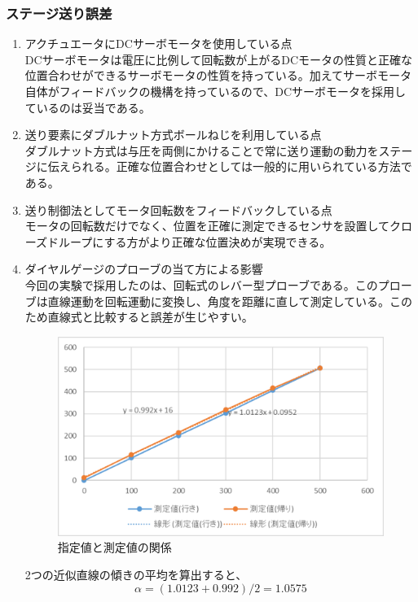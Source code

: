 \documentclass[a4j,twoside,openright,11pt]{jarticle}
\begin{document}
\subsubsection{ステージ送り誤差}
\begin{enumerate}
\item アクチュエータにDCサーボモータを使用している点\\
DCサーボモータは電圧に比例して回転数が上がるDCモータの性質と正確な位置合わせができるサーボモータの性質を持っている。加えてサーボモータ自体がフィードバックの機構を持っているので、DCサーボモータを採用しているのは妥当である。
\item 送り要素にダブルナット方式ボールねじを利用している点\\
ダブルナット方式は与圧を両側にかけることで常に送り運動の動力をステージに伝えられる。正確な位置合わせとしては一般的に用いられている方法である。
\item 送り制御法としてモータ回転数をフィードバックしている点\\
モータの回転数だけでなく、位置を正確に測定できるセンサを設置してクローズドループにする方がより正確な位置決めが実現できる。
\item ダイヤルゲージのプローブの当て方による影響\\
今回の実験で採用したのは、回転式のレバー型プローブである。このプローブは直線運動を回転運動に変換し、角度を距離に直して測定している。このため直線式と比較すると誤差が生じやすい。

\begin{figure}[htbp]
\begin{center}
\includegraphics[width=12cm]{1.eps}
\end{center}
\caption{指定値と測定値の関係}
\end{figure}

2つの近似直線の傾きの平均を算出すると、
\begin{equation}
\alpha=(1.0123+0.992)/2=1.0575
\end{equation}


\end{enumerate}
\end{document}
